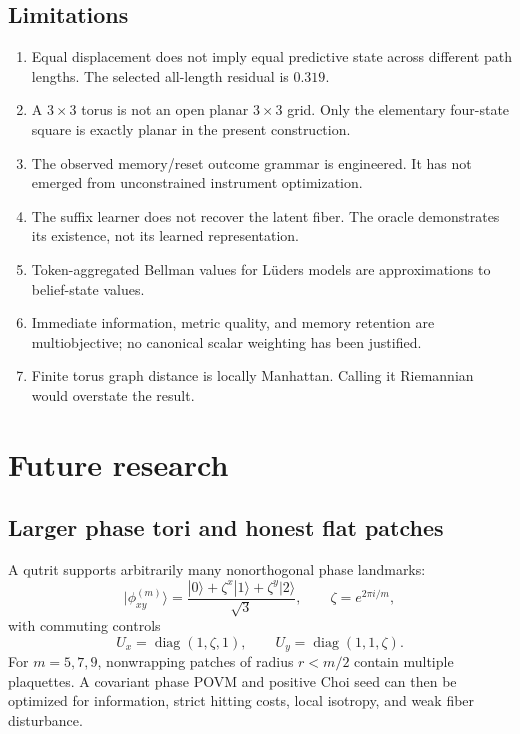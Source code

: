 \documentclass[11pt]{article}
\theoremstyle{definition}
\theoremstyle{remark}
\begin{document}
\subsection{Limitations}

\begin{enumerate}
\item Equal displacement does not imply equal predictive state across
different path lengths. The selected all-length residual is \(0.319\).
\item A \(3\times3\) torus is not an open planar \(3\times3\) grid. Only the
elementary four-state square is exactly planar in the present construction.
\item The observed memory/reset outcome grammar is engineered. It has not
emerged from unconstrained instrument optimization.
\item The suffix learner does not recover the latent fiber. The oracle
demonstrates its existence, not its learned representation.
\item Token-aggregated Bellman values for Lüders models are approximations to
belief-state values.
\item Immediate information, metric quality, and memory retention are
multiobjective; no canonical scalar weighting has been justified.
\item Finite torus graph distance is locally Manhattan. Calling it Riemannian
would overstate the result.
\end{enumerate}

\section{Future research}

\subsection{Larger phase tori and honest flat patches}

A qutrit supports arbitrarily many nonorthogonal phase landmarks:
\[
|\phi_{xy}^{(m)}\rangle=
\frac{|0\rangle+\zeta^x|1\rangle+\zeta^y|2\rangle}{\sqrt3},
\qquad \zeta=e^{2\pi i/m},
\]
with commuting controls
\[
U_x=\operatorname{diag}(1,\zeta,1),\qquad
U_y=\operatorname{diag}(1,1,\zeta).
\]
For \(m=5,7,9\), nonwrapping patches of radius \(r<m/2\) contain multiple
plaquettes. A covariant phase POVM and positive Choi seed can then be
optimized for information, strict hitting costs, local isotropy, and weak
fiber disturbance.
\end{document}
